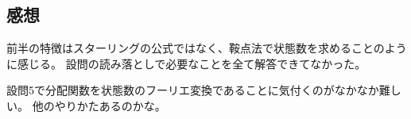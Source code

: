 \documentclass[../../sp_2014.tex]{subfiles}
\begin{document}
\subsection*{感想}
前半の特徴はスターリングの公式ではなく、鞍点法で状態数を求めることのように感じる。
設問の読み落としで必要なことを全て解答できてなかった。

設問5で分配関数を状態数のフーリエ変換であることに気付くのがなかなか難しい。
他のやりかたあるのかな。
\end{document}
